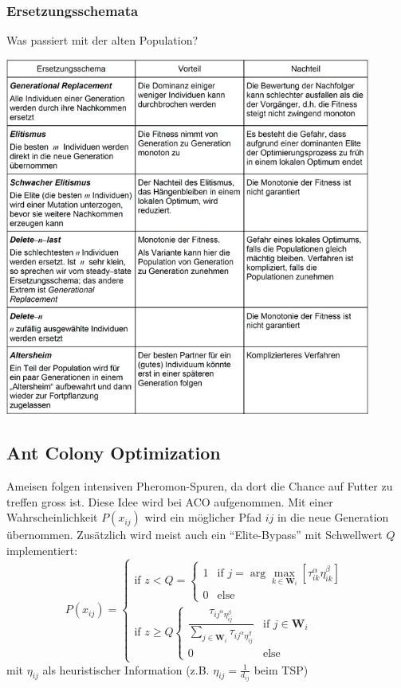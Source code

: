 \subsubsection{Ersetzungsschemata }
  Was passiert mit der alten Population? 
  
  \includegraphics[width=12cm]{./Content/MetaHeuristics/GeneticAlgorithms_Replacements}
   
   
  \subsection{Ant Colony Optimization }
  Ameisen folgen intensiven Pheromon-Spuren, da dort die Chance auf Futter zu treffen gross ist. Diese Idee wird bei ACO aufgenommen. Mit einer Wahrscheinlichkeit $P(x_{ij})$ wird ein möglicher Pfad $ij$ in die neue Generation übernommen. Zusätzlich wird meist auch ein "`Elite-Bypass"' mit Schwellwert $Q$ implementiert:
  $$P(x_{ij}) = 
  \begin{cases}
    \text{if } z < Q = 
    \begin{cases}
      1 & \text{if } j = \arg \max\limits_{k \in \mathbf{W}_i}[\tau_{ik}^\alpha \eta_{ik}^\beta] \\
      0 & \text{else}
    \end{cases} \\
    \text{if } z \geq Q
    \begin{cases}
      \dfrac{\tau_{ij^\alpha \eta_{ij}^\beta}}{\sum\limits_{j \in \mathbf{W}_i} \tau_{ij^\alpha \eta_{ij}^\beta}}  & \text{if }j \in \mathbf{W}_i\\
      0 & \text{else}
    \end{cases}
  \end{cases}$$
  mit $\eta_{ij}$ als heuristischer Information (z.B. $\eta_{ij} = \frac{1}{d_{ij}}$ beim TSP)
  
